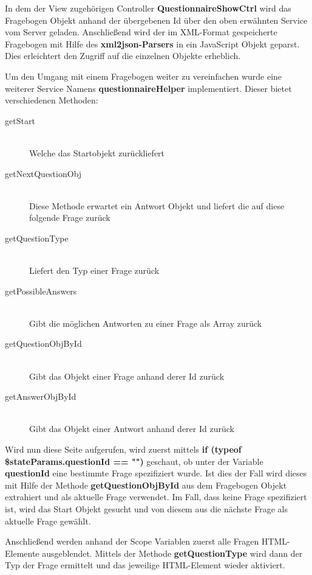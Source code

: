 In dem der View zugehörigen Controller \textbf{QuestionnaireShowCtrl} wird das Fragebogen Objekt anhand der übergebenen Id über den oben erwähnten Service vom Server geladen. Anschließend wird der im XML-Format gespeicherte Fragebogen mit Hilfe des \textbf{xml2json-Parsers} \cite{XML2JSON16} in ein JavaScript Objekt geparst. Dies erleichtert den Zugriff auf die einzelnen Objekte erheblich.

Um den Umgang mit einem Fragebogen weiter zu vereinfachen wurde eine weiterer Service Namens \textbf{questionnaireHelper} implementiert.
Dieser bietet verschiedenen Methoden:
\begin{description}
	\item[getStart]\hfill \\
	Welche das Startobjekt zurückliefert 
	\item[getNextQuestionObj]\hfill \\
	Diese Methode erwartet ein Antwort Objekt und liefert die auf diese folgende Frage zurück 
	\item[getQuestionType]\hfill \\
	Liefert den Typ einer Frage zurück 
	\item[getPossibleAnswers]\hfill \\
	Gibt die möglichen Antworten zu einer Frage als Array zurück 
	\item[getQuestionObjById]\hfill \\
	Gibt das Objekt einer Frage anhand derer Id zurück 
	\item[getAnswerObjById]\hfill \\
	Gibt das Objekt einer Antwort anhand derer Id zurück 
\end{description}

Wird nun diese Seite aufgerufen, wird zuerst mittels \textbf{if (typeof \$stateParams.questionId == "")} geschaut, ob unter der Variable \textbf{questionId} eine bestimmte Frage spezifiziert wurde. Ist dies der Fall wird dieses mit Hilfe der Methode \textbf{getQuestionObjById} aus dem Fragebogen Objekt extrahiert und als aktuelle Frage verwendet. Im Fall, dass keine Frage spezifiziert ist, wird das Start Objekt gesucht und von diesem aus die nächste Frage als aktuelle Frage gewählt.

Anschließend werden anhand der Scope Variablen zuerst alle Fragen HTML-Elemente ausgeblendet. Mittels der Methode \textbf{getQuestionType} wird dann der Typ der Frage ermittelt und das jeweilige HTML-Element wieder aktiviert.
 
